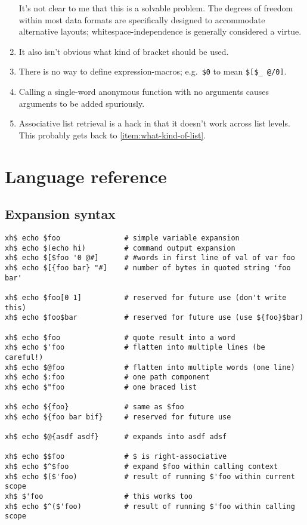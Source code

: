 \documentclass{report}
\begin{document}
\begin{enumerate}
  It's not clear to me that this is a solvable problem. The degrees of
  freedom within most data formats are specifically designed to
  accommodate alternative layouts; whitespace-independence is generally
  considered a virtue.

\item{}
  \label{item:what-kind-of-bracket}
  It also isn't obvious what kind of bracket should be used.

\item{}
  \label{item:no-expression-macros}
  There is no way to define expression-macros; e.g.~\verb|$0| to mean
  \verb|$[$_ @/0]|.

\item{}
  \label{item:ambiguous-eta-expansion}
  Calling a single-word anonymous function with no arguments causes
  arguments to be added spuriously.

\item{}
  \label{item:associative-retrieval}
  Associative list retrieval is a hack in that it doesn't work across
  list levels. This probably gets back to \ref{item:what-kind-of-list}.
\end{enumerate}

\part{Language reference}\label{part:language-reference}
\chapter{Expansion syntax}\label{chp:expansion-syntax}
\begin{verbatim}
xh$ echo $foo               # simple variable expansion
xh$ echo $(echo hi)         # command output expansion
xh$ echo $[$foo '0 @#]      # #words in first line of val of var foo
xh$ echo $[{foo bar} "#]    # number of bytes in quoted string 'foo bar'

xh$ echo $foo[0 1]          # reserved for future use (don't write this)
xh$ echo $foo$bar           # reserved for future use (use ${foo}$bar)

xh$ echo $foo               # quote result into a word
xh$ echo $'foo              # flatten into multiple lines (be careful!)
xh$ echo $@foo              # flatten into multiple words (one line)
xh$ echo $:foo              # one path component
xh$ echo $"foo              # one braced list

xh$ echo ${foo}             # same as $foo
xh$ echo ${foo bar bif}     # reserved for future use

xh$ echo $@{asdf asdf}      # expands into asdf adsf

xh$ echo $$foo              # $ is right-associative
xh$ echo $^$foo             # expand $foo within calling context
xh$ echo $($'foo)           # result of running $'foo within current scope
xh$ $'foo                   # this works too
xh$ echo $^($'foo)          # result of running $'foo within calling scope
\end{verbatim}
\end{document}
